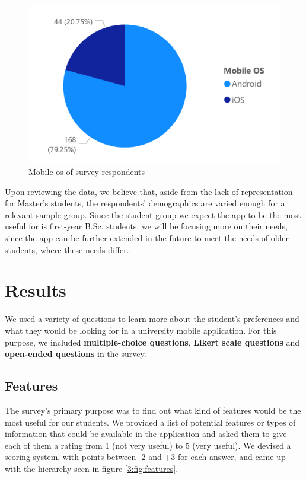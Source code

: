\begin{figure}[ht]
    \centering
         \includegraphics[height=0.2\textheight]{figures/charts/survey/os.pdf}
    \caption{Mobile \acrshort{os} of survey respondents}
    \label{3:fig:os}
\end{figure}

Upon reviewing the data, we believe that, aside from the lack of representation for Master's students, the respondents' demographics are varied enough for a relevant sample group. Since the student group we expect the app to be the most useful for is first-year B.Sc. students, we will be focusing more on their needs, since the app can be further extended in the future to meet the needs of older students, where these needs differ.

\section{Results} \label{3:results}

We used a variety of questions to learn more about the student's preferences and what they would be looking for in a university mobile application. For this purpose, we included \textbf{multiple-choice questions}, \textbf{Likert scale questions} and \textbf{open-ended questions} in the survey.

\subsection{Features} \label{3:features}

The survey's primary purpose was to find out what kind of features would be the most useful for our students. We provided a list of potential features or types of information that could be available in the application and asked them to give each of them a rating from 1 (not very useful) to 5 (very useful). We devised a scoring system, with points between -2 and +3 for each answer, and came up with the hierarchy seen in figure \ref{3:fig:features}.

